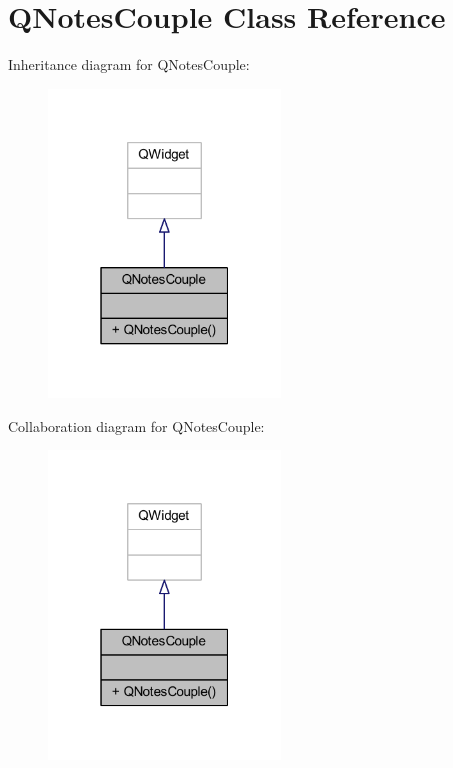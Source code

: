 \hypertarget{class_q_notes_couple}{}\section{Q\+Notes\+Couple Class Reference}
\label{class_q_notes_couple}


Inheritance diagram for Q\+Notes\+Couple\+:
\nopagebreak
\begin{figure}[H]
\begin{center}
\leavevmode
\includegraphics[width=175pt]{class_q_notes_couple__inherit__graph}
\end{center}
\end{figure}


Collaboration diagram for Q\+Notes\+Couple\+:
\nopagebreak
\begin{figure}[H]
\begin{center}
\leavevmode
\includegraphics[width=175pt]{class_q_notes_couple__coll__graph}
\end{center}
\end{figure}
